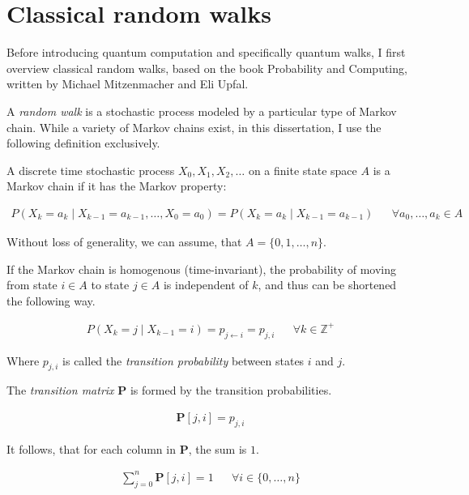 \chapter{Classical random walks}

Before introducing quantum computation and specifically quantum walks, I first overview classical random walks, based on the book Probability and Computing\cite{MitzenmacherProbability}, written by Michael Mitzenmacher and Eli Upfal.

A \textit{random walk} is a stochastic process modeled by a particular type of Markov chain. While a variety of Markov chains exist, in this dissertation, I use the following definition exclusively.

\begin{definition}

A discrete time stochastic process $X_0, X_1, X_2, \dots$ on a finite state space $A$ is a Markov chain if it has the Markov property:

\begin{align*}
P(X_k = a_k \mid X_{k-1} = a_{k-1}, \dots, X_0 = a_0) = P(X_k = a_k \mid X_{k-1} = a_{k-1}) && \forall a_0,\dots,a_k\in A
\end{align*}

\end{definition}

Without loss of generality, we can assume, that $A = \{0,1,\dots,n\}$.

If the Markov chain is homogenous (time-invariant), the probability of moving from state $i \in A$ to state $j \in A$ is independent of $k$, and thus can be shortened the following way.

\begin{align*}
P(X_k = j \mid X_{k-1} = i) = p_{j\leftarrow{}i} = p_{j,i} && \forall k \in \mathds{Z}^+
\end{align*}

Where $p_{j,i}$ is called the \textit{transition probability} between states $i$ and $j$.

The \textit{transition matrix} $\mathbf{P}$ is formed by the transition probabilities.

\begin{align*}
    \mathbf{P}[j,i] = p_{j,i} 
\end{align*}

It follows, that for each column in $\mathbf{P}$, the sum is $1$.

\begin{align*}
    \sum\limits_{j=0}^{n}\mathbf{P}[j,i] = 1 && \forall i \in \{0,\dots,n\}
\end{align*}


